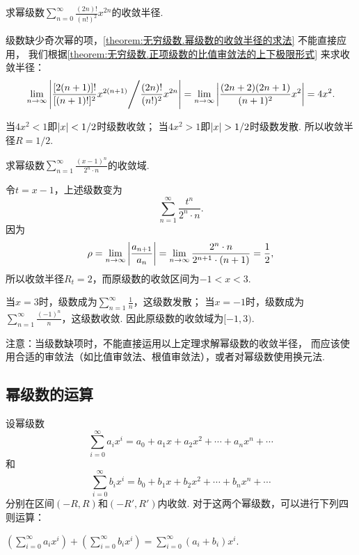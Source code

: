 \begin{example}
求幂级数\(\sum\limits_{n=0}^\infty \frac{(2n)!}{(n!)^2} x^{2n}\)的收敛半径.
\begin{solution}
级数缺少奇次幂的项，\cref{theorem:无穷级数.幂级数的收敛半径的求法} 不能直接应用，%
我们根据\cref{theorem:无穷级数.正项级数的比值审敛法的上下极限形式} 来求收敛半径：
\[
\lim\limits_{n\to\infty} \abs{{\frac{[2(n+1)]!}{[(n+1)!]^2} x^{2(n+1)}}\Bigg/{\frac{(2n)!}{(n!)^2} x^{2n}}}
= \lim\limits_{n\to\infty} \abs{\frac{(2n+2)(2n+1)}{(n+1)^2} x^2}
= 4 x^2.
\]

当\(4 x^2 < 1\)即\(\abs{x} < 1/2\)时级数收敛；
当\(4 x^2 > 1\)即\(\abs{x} > 1/2\)时级数发散.
所以收敛半径\(R = 1/2\).
\end{solution}
\end{example}

\begin{example}
求幂级数\(\sum\limits_{n=1}^\infty \frac{(x-1)^n}{2^n \cdot n}\)的收敛域.
\begin{solution}
令\(t = x-1\)，上述级数变为\[
\sum\limits_{n=1}^\infty \frac{t^n}{2^n \cdot n}.
\]因为\[
\rho = \lim\limits_{n\to\infty} \abs{\frac{a_{n+1}}{a_n}} = \lim\limits_{n\to\infty} \frac{2^n \cdot n}{2^{n+1} \cdot (n+1)} = \frac{1}{2},
\]所以收敛半径\(R_t = 2\)，而原级数的收敛区间为\(-1<x<3\).

当\(x=3\)时，级数成为\(\sum\limits_{n=1}^\infty \frac{1}{n}\)，这级数发散；
当\(x=-1\)时，级数成为\(\sum\limits_{n=1}^\infty \frac{(-1)^n}{n}\)，这级数收敛.
因此原级数的收敛域为\([-1,3)\).
\end{solution}
\end{example}

注意：当级数缺项时，不能直接运用以上定理求解幂级数的收敛半径，%
而应该使用合适的审敛法（如比值审敛法、根值审敛法），或者对幂级数使用换元法.

\subsection{幂级数的运算}
设幂级数\[
\sum\limits_{i=0}^\infty a_i x^i
= a_0 + a_1 x + a_2 x^2 + \dotsb + a_n x^n + \dotsb
\]和\[
\sum\limits_{i=0}^\infty b_i x^i
= b_0 + b_1 x + b_2 x^2 + \dotsb + b_n x^n + \dotsb
\]分别在区间\((-R,R)\)和\((-R',R')\)内收敛.
对于这两个幂级数，可以进行下列四则运算：

\begin{definition}[幂级数的加法]
\(\left(\sum\limits_{i=0}^\infty a_i x^i\right)
+ \left(\sum\limits_{i=0}^\infty b_i x^i\right)
= \sum\limits_{i=0}^\infty (a_i+b_i) x^i\).
\end{definition}

